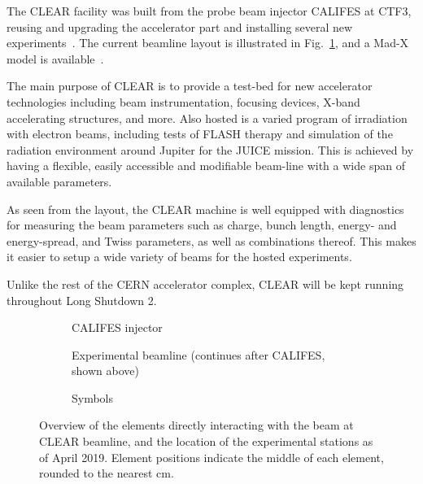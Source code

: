 \documentclass[a4paper,
               keeplastbox,   %
               ]{jacow}
\begin{document}
The CLEAR facility was built from the probe beam injector CALIFES at CTF3, reusing and upgrading the accelerator part and installing several new experiments~\cite{Gamba::CLEAR,Corsini:FirstCLEAR}.
The current beamline layout is illustrated in Fig.~\ref{fig:layout}, and a Mad-X model is available~\cite{CLEAR-MADX}.

The main purpose of CLEAR is to provide a test-bed for new accelerator technologies including beam instrumentation, focusing devices, X-band accelerating structures, and more.
Also hosted is a varied program of irradiation with electron beams, including tests of FLASH therapy and simulation of the radiation environment around Jupiter for the JUICE mission.
This is achieved by having a flexible, easily accessible and modifiable beam-line with a wide span of available parameters. 

As seen from the layout, the CLEAR machine is well equipped with diagnostics for measuring the beam parameters such as charge, bunch length, energy- and energy-spread, and Twiss parameters, as well as combinations thereof.
This makes it easier to setup a wide variety of beams for the hosted experiments.

Unlike the rest of the CERN accelerator complex, CLEAR will be kept running throughout Long Shutdown 2.

\begin{figure}
    \centering
    \begin{subfigure}[h]{\textwidth}
        \centering
        
        \vspace{-2em} %
        \caption{CALIFES injector}
    \end{subfigure}
    \begin{subfigure}[h]{\textwidth}
        \centering
        \vspace{-1em}
        
        \vspace{-0.5em}
        \caption{Experimental beamline
        (continues after CALIFES, shown above)}
    \end{subfigure}
    \begin{subfigure}[h]{\textwidth}
        \centering
        
        \vspace{-2em} %
        \caption{Symbols}
    \end{subfigure}
    \caption{Overview of the elements directly interacting with the beam at CLEAR beamline, and the location of the experimental stations as of April 2019. Element positions indicate the middle of each element, rounded to the nearest cm.}
    \label{fig:layout}
\end{figure}
\end{document}

